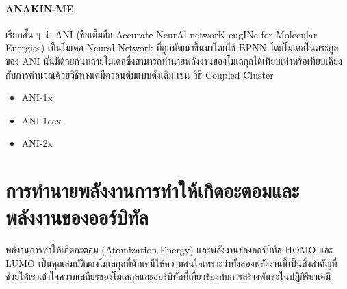 \paragraph{ANAKIN-ME} เรียกสั้น ๆ ว่า ANI (ชื่อเต็มคือ Accurate NeurAl networK engINe for Molecular Energies) เป็นโมเดล Neural Network ที่ถูกพัฒนาขึ้นมาโดยใช้ BPNN โดยโมเดลในตระกูลของ ANI นั้นมีด้วยกันหลายโมเดลซึ่งสามารถทำนายพลังงานของโมเลกุลได้เทียบเท่าหรือเทียบเคียงกับการคำนวณด้วยวิธีทางเคมีควอนตัมแบบดั้งเดิม เช่น วิธี Coupled Cluster
%
\begin{itemize}[topsep=0pt,noitemsep]\setlength\itemsep{0.5em}
    \item ANI-1x\autocite{smith2017}

    \item ANI-1ccx\autocite{smith2018}

    \item ANI-2x\autocite{smith2019,devereux2020}
\end{itemize}

\section{การทำนายพลังงานการทำให้เกิดอะตอมและพลังงานของออร์บิทัล}
\label{sec:pred_ener_atom_orb}

พลังานการทำให้เกิดอะตอม (Atomization Energy) และพลังงานของออร์บิทัล HOMO และ LUMO เป็นคุณสมบัติของโมเลกุลที่นักเคมีให้ความสนใจเพราะว่าทั้งสองพลังงานนี้เป็นสิ่งสำคัญที่ช่วยให้เราเข้าใจความเสถียรของโมเลกุลและออร์บิทัลที่เกี่ยวข้องกับการสร้างพันธะในปฏิกิริยาเคมี

